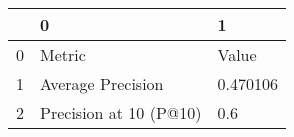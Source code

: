 \begin{tabular}{lll}
\toprule
{} &                       0 &         1 \\
\midrule
0 &                  Metric &     Value \\
1 &       Average Precision &  0.470106 \\
2 &  Precision at 10 (P@10) &       0.6 \\
\bottomrule
\end{tabular}
